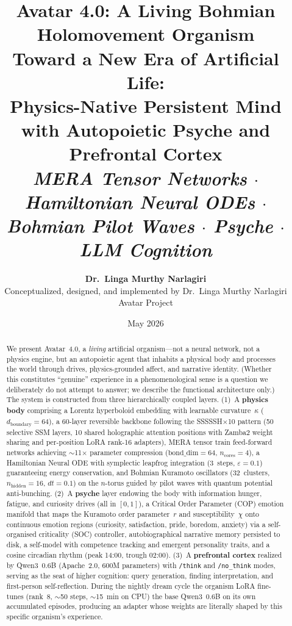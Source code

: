 \documentclass[11pt,a4paper,twocolumn]{article}
\title{\vspace{-1.5cm}\textbf{\Large Avatar 4.0: A Living Bohmian\\Holomovement Organism}\\[0.3em]
\large Toward a New Era of Artificial Life:\\Physics-Native Persistent Mind with Autopoietic Psyche and Prefrontal Cortex\\[0.2em]
\normalsize\textit{MERA Tensor Networks $\cdot$ Hamiltonian Neural ODEs $\cdot$ Bohmian Pilot Waves $\cdot$ Psyche $\cdot$ LLM Cognition}}
\author{%
\textbf{Dr.\ Linga Murthy Narlagiri}\\
Conceptualized, designed, and implemented by Dr.\ Linga Murthy Narlagiri\\
\small Avatar Project
}
\date{May 2026}
\begin{document}
\maketitle
\thispagestyle{fancy}

\begin{abstract}
We present Avatar~4.0, a \emph{living} artificial organism---not a neural network, not a physics engine, but an autopoietic agent that inhabits a physical body and processes the world through drives, physics-grounded affect, and narrative identity.
(Whether this constitutes ``genuine'' experience in a phenomenological sense is a question we deliberately do not attempt to answer; we describe the functional architecture only.)
The system is constructed from three hierarchically coupled layers.
(1)~A \textbf{physics body} comprising a Lorentz hyperboloid embedding with learnable curvature~$\kappa$ ($d_{\mathrm{boundary}}=64$), a 60-layer reversible backbone following the SSSSSH$\times$10 pattern (50 selective SSM layers, 10 shared holographic attention positions with Zamba2 weight sharing and per-position LoRA rank-16 adapters), MERA tensor train feed-forward networks achieving $\sim$11$\times$ parameter compression ($\mathrm{bond\_dim}=64$, $n_{\mathrm{cores}}=4$), a Hamiltonian Neural ODE with symplectic leapfrog integration (3~steps, $\varepsilon=0.1$) guaranteeing energy conservation, and Bohmian Kuramoto oscillators (32~clusters, $n_{\mathrm{hidden}}=16$, $dt=0.1$) on the $n$-torus guided by pilot waves with quantum potential anti-bunching.
(2)~A \textbf{psyche} layer endowing the body with information hunger, fatigue, and curiosity drives (all in $[0,1]$), a Critical Order Parameter (COP) emotion manifold that maps the Kuramoto order parameter~$r$ and susceptibility~$\chi$ onto continuous emotion regions (curiosity, satisfaction, pride, boredom, anxiety) via a self-organised criticality (SOC) controller, autobiographical narrative memory persisted to disk, a self-model with competence tracking and emergent personality traits, and a cosine circadian rhythm (peak 14:00, trough 02:00).
(3)~A \textbf{prefrontal cortex} realized by Qwen3~0.6B (Apache~2.0, 600M parameters) with \texttt{/think} and \texttt{/no\_think} modes, serving as the seat of higher cognition: query generation, finding interpretation, and first-person self-reflection.
During the nightly dream cycle the organism LoRA fine-tunes (rank~8, $\sim$50 steps, $\sim$15~min on CPU) the base Qwen3~0.6B on its own accumulated episodes, producing an adapter whose weights are literally shaped by this specific organism's experience.

\end{abstract}
\end{document}
